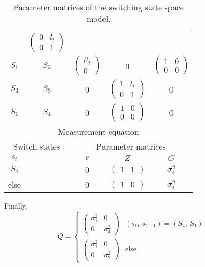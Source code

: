\documentclass[11pt]{article}
\begin{document}
\begin{table}[h!]
\begin{tabular}[h!]{cc|ccc}
          & $\begin{pmatrix} 0 & l_t\\ 0 & 1 \end{pmatrix}$\\
  $S_1$ & $S_3$ & $\begin{pmatrix} \mu_t\\0\end{pmatrix}$ & 0
          & $\begin{pmatrix} 1 & 0\\ 0 & 0 \end{pmatrix}$\\
  $S_3$ & $S_3$ & 0& $\begin{pmatrix} 1 & l_t \\ 0 &
    1 \end{pmatrix}$ & 0\\
  $S_1$ &  $S_4$ & 0 & $\begin{pmatrix}1&0\\0&0\end{pmatrix}$ & 0\\
  \hline\hline
  \multicolumn{5}{c}{Measurement equation}\\
  \hline
  \multicolumn{2}{c|}{Switch states} & \multicolumn{3}{c}{Parameter
                                      matrices}\\
  $s_t$ && $c$ & $Z$ & $G$\\
  \hline
  $S_4$ & & 0 & $\begin{pmatrix} 1 & 1 \end{pmatrix}$ &
                                                                  $\sigma^2_\epsilon$\\
  else && 0 & $\begin{pmatrix} 1 & 0 \end{pmatrix}$ &
                                                                  $\sigma^2_\epsilon$\\
  \hline\hline
\end{tabular}
\caption{Parameter matrices of the switching state space model.\label{tab:parmats}}
\end{table}
Finally, 
\[
Q=\begin{cases}\begin{pmatrix} \sigma^2_1 &
    0\\0&\sigma^2_4\end{pmatrix} & (s_t,\ s_{t-1})=(S_4,\ S_1)\\
\begin{pmatrix} \sigma^2_1 &
    0\\0&\sigma^2_2\end{pmatrix} & \textrm{else}.
\end{cases}
\] 
\end{document}
